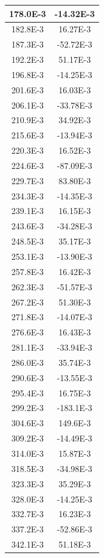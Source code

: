\documentclass[english, 12pt, a4paper]{ifimaster}
\begin{document}
\begin{appendices}
\begin{center}
\begin{longtable}[htbp]{|c|c|}
\hline
  178.0E-3 & -14.32E-3 \\
\hline
  182.8E-3 & 16.27E-3 \\
\hline
  187.3E-3 & -52.72E-3 \\
\hline
  192.2E-3 & 51.17E-3 \\
\hline
  196.8E-3 & -14.25E-3 \\
\hline
  201.6E-3 & 16.03E-3 \\
\hline
  206.1E-3 & -33.78E-3 \\
\hline
  210.9E-3 & 34.92E-3 \\
\hline
  215.6E-3 & -13.94E-3 \\
\hline
  220.3E-3 & 16.52E-3 \\
\hline
  224.6E-3 & -87.09E-3 \\
\hline
  229.7E-3 & 83.80E-3 \\
\hline
  234.3E-3 & -14.35E-3 \\
\hline
  239.1E-3 & 16.15E-3 \\
\hline
  243.6E-3 & -34.28E-3 \\
\hline
  248.5E-3 & 35.17E-3 \\
\hline
  253.1E-3 & -13.90E-3 \\
\hline
  257.8E-3 & 16.42E-3 \\
\hline
  262.3E-3 & -51.57E-3 \\
\hline
  267.2E-3 & 51.30E-3 \\
\hline
  271.8E-3 & -14.07E-3 \\
\hline
  276.6E-3 & 16.43E-3 \\
\hline
  281.1E-3 & -33.94E-3 \\
\hline
  286.0E-3 & 35.74E-3 \\
\hline
  290.6E-3 & -13.55E-3 \\
\hline
  295.4E-3 & 16.75E-3 \\
\hline
  299.2E-3 & -183.1E-3 \\
\hline
  304.6E-3 & 149.6E-3 \\
\hline
  309.2E-3 & -14.49E-3 \\
\hline
  314.0E-3 & 15.87E-3 \\
\hline
  318.5E-3 & -34.98E-3 \\
\hline
  323.3E-3 & 35.29E-3 \\
\hline
  328.0E-3 & -14.25E-3 \\
\hline
  332.7E-3 & 16.23E-3 \\
\hline
  337.2E-3 & -52.86E-3 \\
\hline
  342.1E-3 & 51.18E-3 \\

\end{longtable}
\end{center}
\end{appendices}
\end{document}
